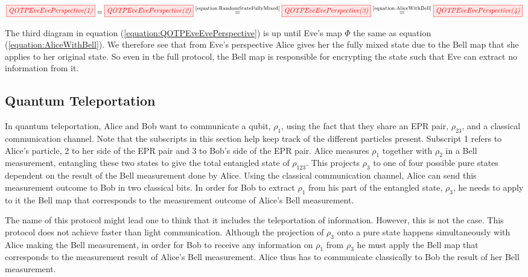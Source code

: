 \documentclass[]{article}
\newcommand{\equaltext}[1]{\ensuremath{\stackrel{\text{#1}}{=}}}
\begin{document}
\begin{equation}
	\label{equation:QOTPEveEvePerspective}
	\tikzfig{QOTPEveEvePerspective(1)} =
	\tikzfig{QOTPEveEvePerspective(2)} \equaltext{\ref{equation:RandomStateFullyMixed}}
	\tikzfig{QOTPEveEvePerspective(3)} \equaltext{\ref{equation:AliceWithBell}}
	\tikzfig{QOTPEveEvePerspective(4)}
\end{equation}

The third diagram in equation (\ref{equation:QOTPEveEvePerspective}) is up until Eve's map $\Phi$ the same as equation (\ref{equation:AliceWithBell}). We therefore see that from Eve's perspective Alice gives her the fully mixed state due to the Bell map that she applies to her original state. So even in the full protocol, the Bell map is responsible for encrypting the state such that Eve can extract no information from it. 

\subsection{Quantum Teleportation}

In quantum teleportation, Alice and Bob want to communicate a qubit, $\rho_1$, using the fact that they share an EPR pair, $\rho_{23}$, and a classical communication channel. Note that the subscripts in this section help keep track of the different particles present. Subscript 1 refers to Alice's particle, 2 to her side of the EPR pair and 3 to Bob's side of the EPR pair. Alice measures $\rho_1$ together with $\rho_{2}$ in a Bell measurement, entangling these two states to give the total entangled state of $\rho_{123}$. This projects $\rho_{3}$ to one of four possible pure states dependent on the result of the Bell measurement done by Alice. Using the classical communication channel, Alice can send this measurement outcome to Bob in two classical bits. In order for Bob to extract  $\rho_1$ from his part of the entangled state, $\rho_{3}$, he needs to apply to it the Bell map that corresponds to the measurement outcome of Alice's Bell measurement.


The name of this protocol might lead one to think that it includes the teleportation of information. However, this is not the case. This protocol does not achieve faster than light communication. Although the projection of $\rho_{3}$ onto a pure state happens simultaneously with Alice making the Bell measurement, in order for Bob to receive any information on $\rho_1$ from $\rho_{3}$ he must apply the Bell map that corresponds to the measurement result of Alice's Bell measurement. Alice thus has to communicate classically to Bob the result of her Bell measurement.
\end{document}
